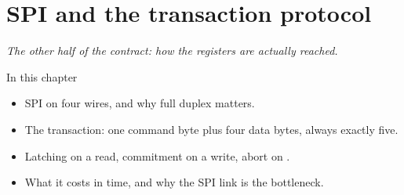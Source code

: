 \chapter{SPI and the transaction protocol}
\label{ch:spi}


{\large\itshape The other half of the contract: how the registers are actually reached.\par}

\begin{chapterbox}{In this chapter}
\begin{itemize}
  \item SPI on four wires, and why full duplex matters.
  \item The transaction: one command byte plus four data bytes, always exactly five.
  \item Latching on a read, commitment on a write, abort on .
  \item What it costs in time, and why the SPI link is the bottleneck.
\end{itemize}
\end{chapterbox}




